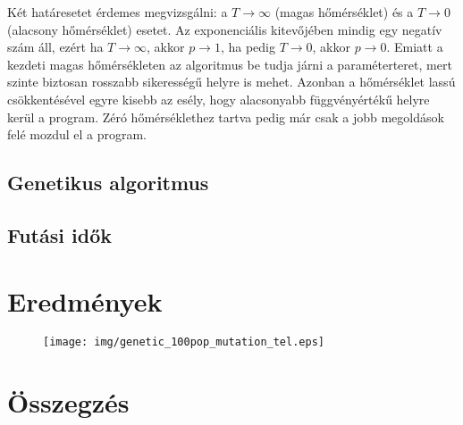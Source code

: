 \documentclass[12pt]{article}
\begin{document}
Két határesetet érdemes megvizsgálni: a $T \rightarrow \infty$ (magas hőmérséklet) és a $T \rightarrow 0$ (alacsony hőmérséklet) esetet. Az exponenciális kitevőjében mindig egy negatív szám áll, ezért ha $T \rightarrow \infty$, akkor $p \rightarrow 1$, ha pedig $T \rightarrow 0$, akkor $p \rightarrow 0$.
Emiatt a kezdeti magas hőmérsékleten az algoritmus be tudja járni a paraméterteret, mert szinte biztosan rosszabb sikerességű helyre is mehet. Azonban a hőmérséklet lassú csökkentésével egyre kisebb az esély, hogy alacsonyabb függvényértékű helyre kerül a program. Zéró hőmérséklethez tartva pedig már csak a jobb megoldások felé mozdul el a program. 


\subsection{Genetikus algoritmus}
\cite{genetic_algorithm} %
\subsection{Futási idők}
\section{Eredmények}
\begin{figure}[H]
	\centering
	\texttt{[image: img/genetic\_100pop\_mutation\_tel.eps]}
\end{figure}
\section{Összegzés}

\end{document}
